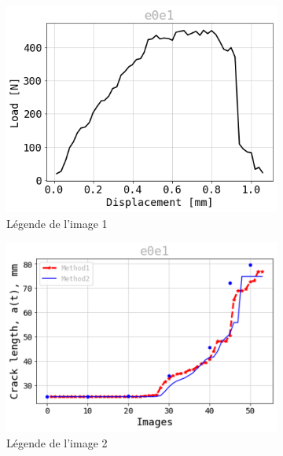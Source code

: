 \documentclass[3p,times,procedia]{elsarticle}
\begin{document}
\begin{figure}[htbp]
	\centering
	\begin{subfigure}[b]{0.45\textwidth}
		\centering
		\includegraphics[width=\textwidth]{Figures/P_e0e1}
		\caption{Légende de l'image 1}
		\label{fig:image1}
	\end{subfigure}
	\hfill
	\begin{subfigure}[b]{0.45\textwidth}
		\centering
		\includegraphics[width=\textwidth]{Figures/a_e0e1}
		\caption{Légende de l'image 2}
		\label{fig:image2}
	\end{subfigure}
	\\
	\begin{subfigure}[b]{0.45\textwidth}
		\centering

\end{subfigure}
\end{figure}
\end{document}
